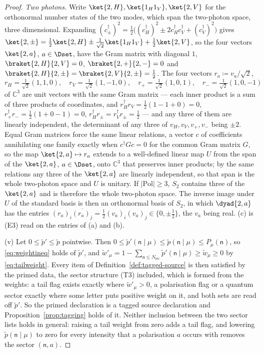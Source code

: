 \begin{proof}
\emph{Two photons.} Write $\ket{2,H},\ket{1_H1_V},\ket{2,V}$ for the
orthonormal number states of the two modes, which span the two-photon space,
three dimensional. Expanding
$(c^{\dagger}_{\pm})^2=\tfrac12\big((c^{\dagger}_H)^2
\pm2c^{\dagger}_Hc^{\dagger}_V+(c^{\dagger}_V)^2\big)$ gives
$\ket{2,\pm}=\tfrac12\ket{2,H}\pm\tfrac1{\sqrt2}\ket{1_H1_V}
+\tfrac12\ket{2,V}$, so the four vectors $\ket{2,a}$, $a\in\Dset$, have the
Gram matrix with diagonal $1$, $\braket{2,H}{2,V}=0$, $\braket{2,+}{2,-}=0$
and $\braket{2,H}{2,\pm}=\braket{2,V}{2,\pm}=\tfrac12$. The four vectors
$r_a\coloneqq v_a/\sqrt2$,
\begin{equation*}
  r_H=\tfrac1{\sqrt2}(1,1,0),\quad r_V=\tfrac1{\sqrt2}(1,-1,0),\quad
  r_+=\tfrac1{\sqrt2}(1,0,1),\quad r_-=\tfrac1{\sqrt2}(1,0,-1)
\end{equation*}
of $\mathbb{C}^3$ are unit vectors with the same Gram matrix --- each inner
product is a sum of three products of coordinates, and
$r_H^{\dagger}r_V=\tfrac12(1-1+0)=0$, $r_+^{\dagger}r_-=\tfrac12(1+0-1)=0$,
$r_H^{\dagger}r_{\pm}=r_V^{\dagger}r_{\pm}=\tfrac12$ --- and any three of them
are linearly independent, the determinant of any three of $v_H,v_V,v_+,v_-$
being $\pm2$. Equal Gram matrices force the same linear relations, a vector
$c$ of coefficients annihilating one family exactly when $c^{\dagger}Gc=0$ for
the common Gram matrix $G$, so the map $\ket{2,a}\mapsto r_a$ extends to a
well-defined linear map $U$ from the span of the $\ket{2,a}$, $a\in\Dset$,
onto $\mathbb{C}^3$ that preserves inner products; by the same relations any
three of the $\ket{2,a}$ are linearly independent, so that span is the whole
two-photon space and $U$ is unitary. If $|\mathrm{Pol}|\ge3$, $S_2$ contains
three of the $\ket{2,a}$ and is therefore the whole two-photon space. The
inverse image under $U$ of the standard basis is then an orthonormal basis of
$S_2$, in which $\dyad{2,a}$ has the entries
$(r_a)_i\overline{(r_a)_j}=\tfrac12(v_a)_i(v_a)_j\in\{0,\pm\tfrac12\}$, the
$v_a$ being real. (c) is (E3) read on the entries of (a) and (b).

(v) Let $0\le\tilde p'\le\tilde p$ pointwise. Then
$0\le\tilde p'(\mathsf{n}\mid\mu)\le\tilde p(\mathsf{n}\mid\mu)\le
P_{\mu}(\mathsf{n})$, so \eqref{eq:weightineq} holds of $\tilde p'$, and
$\tilde w'_{\mu}=1-\sum_{\mathsf{n}\le N_{\mathrm{src}}}
\tilde p'(\mathsf{n}\mid\mu)\ge\tilde w_{\mu}\ge0$ by \eqref{eq:tailweight}.
Every item of Definition~\ref{def:tagged-source} is then satisfied by the primed
data, the sector structure (T3) included, which is formed from the weights: a
tail flag exists exactly where $\tilde w'_{\mu}>0$, a polarisation flag or a
quantum sector exactly where some letter puts positive weight on it, and both
sets are read off $\tilde p'$. So the primed declaration is a tagged source
declaration and Proposition~\ref{prop:tagging} holds of it. Neither inclusion
between the two sector lists holds in general: raising a tail weight from zero
adds a tail flag, and lowering $\tilde p(\mathsf{n}\mid\mu)$ to zero for every
intensity that a polarisation $a$ occurs with removes the sector
$(\mathsf{n},a)$.
\end{proof}
